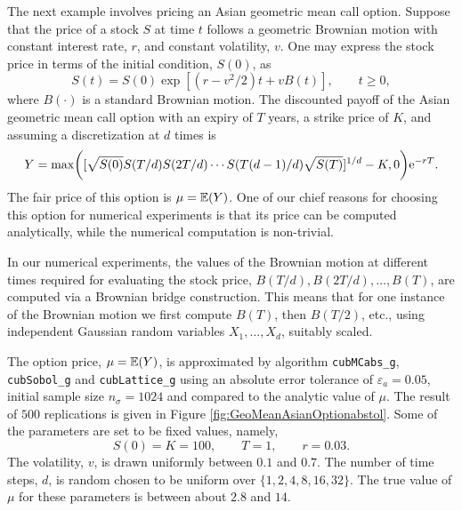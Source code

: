 \documentclass{iitthesis}
\begin{document}
\label{subsec:asiancallopt}
The next example involves pricing an Asian geometric mean call option.  Suppose that the price of a stock $S$ at time $t$ follows a geometric Brownian motion with constant interest rate, $r$, and constant volatility, $v$.  
One may express the stock price in terms of the initial condition, $S(0)$, as 
\[
S(t)=S(0) \exp[(r-v^2/2)t + v B(t)], \qquad t \ge 0,
\]
where $B(\cdot)$ is a standard Brownian motion.  
The discounted payoff of the Asian geometric mean call option with an expiry of $T$ years, a strike price of $K$, and assuming a discretization at $d$ times is 
\begin{equation} \label{payoff}
Y=\max\biggl([\sqrt{S(0)}S(T/d) S(2T/d)\cdots S(T(d-1)/d) \sqrt{S(T)}]^{1/d} - K,0 \biggr)\mathrm{e}^{-rT}.
\end{equation}
The fair price of this option is $\mu=\mathbb{E}(Y)$. One of our chief reasons for choosing this option for numerical experiments is that its price can be computed analytically, while the numerical computation is non-trivial.

In our numerical experiments, the values of the Brownian motion at different times required for evaluating the stock price, $B(T/d), B(2T/d), \ldots,  B(T)$, are computed via a Brownian bridge construction.  This means that for one instance of the Brownian motion we first compute $B(T)$, then $B(T/2)$, etc., using independent Gaussian random variables $X_1, \ldots, X_d$, suitably scaled. 


The option price, $\mu=\mathbb{E}(Y)$, is approximated by algorithm {\tt cubMCabs\_g}, {\tt cubSobol\_g} and {\tt cubLattice\_g} using an absolute error tolerance of $\varepsilon_a=0.05$, initial sample size $n_\sigma=1024$ and compared to the analytic value of $\mu$.  The result of $500$ replications is given in Figure \ref{fig:GeoMeanAsianOptionabstol}.  Some of the parameters are set to be fixed values, namely,
\[
S(0)=K=100, \qquad T=1, \qquad r=0.03.
\]
The volatility, $v$, is drawn uniformly between $0.1$ and $0.7$.  The number of time steps, $d$, is random chosen to be uniform over $\{1, 2, 4, 8, 16, 32\}$.  The true value of $\mu$ for these parameters is between about $2.8$ and $14$.
\end{document}
